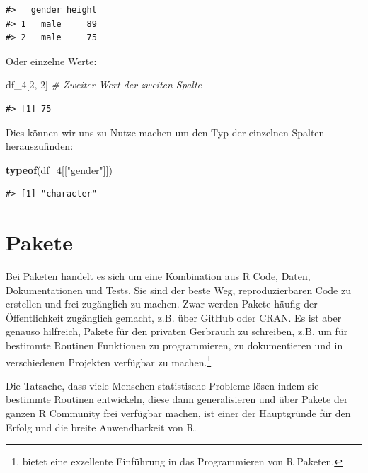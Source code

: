 \documentclass[]{book}
\newenvironment{Shaded}{\begin{snugshade}}{\end{snugshade}}
\newcommand{\KeywordTok}[1]{\textcolor[rgb]{0.13,0.29,0.53}{\textbf{#1}}}
\newcommand{\DecValTok}[1]{\textcolor[rgb]{0.00,0.00,0.81}{#1}}
\newcommand{\StringTok}[1]{\textcolor[rgb]{0.31,0.60,0.02}{#1}}
\newcommand{\CommentTok}[1]{\textcolor[rgb]{0.56,0.35,0.01}{\textit{#1}}}
\newcommand{\NormalTok}[1]{#1}
\let\rmarkdownfootnote\footnote%
\def\footnote{\protect\rmarkdownfootnote}
\begin{document}
\begin{verbatim}
#>   gender height
#> 1   male     89
#> 2   male     75
\end{verbatim}

Oder einzelne Werte:

\begin{Shaded}
\begin{Highlighting}[]
\NormalTok{df_}\DecValTok{4}\NormalTok{[}\DecValTok{2}\NormalTok{, }\DecValTok{2}\NormalTok{] }\CommentTok{# Zweiter Wert der zweiten Spalte}
\end{Highlighting}
\end{Shaded}

\begin{verbatim}
#> [1] 75
\end{verbatim}

Dies können wir uns zu Nutze machen um den Typ der einzelnen Spalten
herauszufinden:

\begin{Shaded}
\begin{Highlighting}[]
\KeywordTok{typeof}\NormalTok{(df_}\DecValTok{4}\NormalTok{[[}\StringTok{"gender"}\NormalTok{]])}
\end{Highlighting}
\end{Shaded}

\begin{verbatim}
#> [1] "character"
\end{verbatim}

\section{Pakete}\label{pakete}

Bei Paketen handelt es sich um eine Kombination aus R Code, Daten,
Dokumentationen und Tests. Sie sind der beste Weg, reproduzierbaren Code
zu erstellen und frei zugänglich zu machen. Zwar werden Pakete häufig
der Öffentlichkeit zugänglich gemacht, z.B. über GitHub oder CRAN. Es
ist aber genauso hilfreich, Pakete für den privaten Gerbrauch zu
schreiben, z.B. um für bestimmte Routinen Funktionen zu programmieren,
zu dokumentieren und in verschiedenen Projekten verfügbar zu
machen.\footnote{\citet{Packages} bietet eine exzellente Einführung in
  das Programmieren von R Paketen.}

Die Tatsache, dass viele Menschen statistische Probleme lösen indem sie
bestimmte Routinen entwickeln, diese dann generalisieren und über Pakete
der ganzen R Community frei verfügbar machen, ist einer der Hauptgründe
für den Erfolg und die breite Anwendbarkeit von R.
\end{document}
